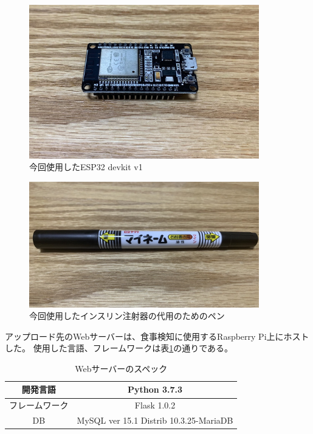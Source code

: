 \begin{figure}[htbp]
  \caption{今回使用したESP32 devkit v1}
  \label{fig:esp32}
  \begin{center}
    \includegraphics[bb=0 0 1300 1100,width=10cm]{assets/esp32.jpg}
  \end{center}
\end{figure}

\begin{figure}[htbp]
  \caption{今回使用したインスリン注射器の代用のためのペン}
  \label{fig:insulin_pen}
  \begin{center}
    \includegraphics[bb=0 0 1400 900,width=10cm]{assets/pen.jpg}
  \end{center}
\end{figure}


アップロード先のWebサーバーは、食事検知に使用するRaspberry Pi上にホストした。
使用した言語、フレームワークは表\ref{tb:web_server}の通りである。

\begin{table}[htbp]
  \caption{Webサーバーのスペック}
  \label{tb:web_server}
  \begin{center}
    \begin{tabular}{|c||c|}
      \hline
      開発言語  & Python 3.7.3 \\\hline
      フレームワーク  & Flask 1.0.2 \\\hline
      DB & MySQL ver 15.1 Distrib 10.3.25-MariaDB \\\hline
    \end{tabular}
  \end{center}
\end{table}


